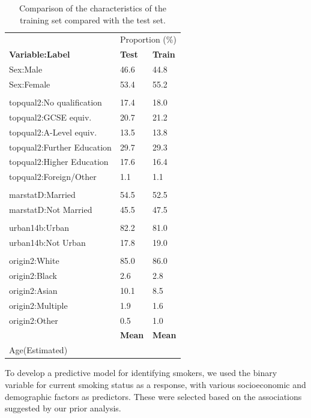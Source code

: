 \documentclass[
  11pt,
  twocolumn]{article}
\begin{document}
\begin{table}
\centering
\caption{\label{tab:outputtesttraintable}Comparison of the characteristics of the training set compared with the test set.\label{tab:output-testtrain-table}}
\centering
\fontsize{10}{12}\selectfont
\begin{tabular}[t]{l|l|l}
\hline
\multicolumn{1}{c|}{ } & \multicolumn{2}{c}{Proportion (\%)} \\
\cline{2-3}
\textbf{Variable:Label} & \textbf{Test} & \textbf{Train}\\
\hline
Sex:Male & 46.6 & 44.8\\
\hline
Sex:Female & 53.4 & 55.2\\
\hline
 &  \vphantom{3} & \\
\hline
topqual2:No qualification & 17.4 & 18.0\\
\hline
topqual2:GCSE equiv. & 20.7 & 21.2\\
\hline
topqual2:A-Level equiv. & 13.5 & 13.8\\
\hline
topqual2:Further Education & 29.7 & 29.3\\
\hline
topqual2:Higher Education & 17.6 & 16.4\\
\hline
topqual2:Foreign/Other & 1.1 & 1.1\\
\hline
 &  \vphantom{2} & \\
\hline
marstatD:Married & 54.5 & 52.5\\
\hline
marstatD:Not Married & 45.5 & 47.5\\
\hline
 &  \vphantom{1} & \\
\hline
urban14b:Urban & 82.2 & 81.0\\
\hline
urban14b:Not Urban & 17.8 & 19.0\\
\hline
 &  & \\
\hline
origin2:White & 85.0 & 86.0\\
\hline
origin2:Black & 2.6 & 2.8\\
\hline
origin2:Asian & 10.1 & 8.5\\
\hline
origin2:Multiple & 1.9 & 1.6\\
\hline
origin2:Other & 0.5 & 1.0\\
\hline
\textbf{} & \textbf{Mean} & \textbf{Mean}\\
\hline
Age(Estimated) &  & \\
\hline
\end{tabular}
\end{table}

To develop a predictive model for identifying smokers, we used the
binary variable for current smoking status as a response, with various
socioeconomic and demographic factors as predictors. These were selected
based on the associations suggested by our prior analysis.
\end{document}
